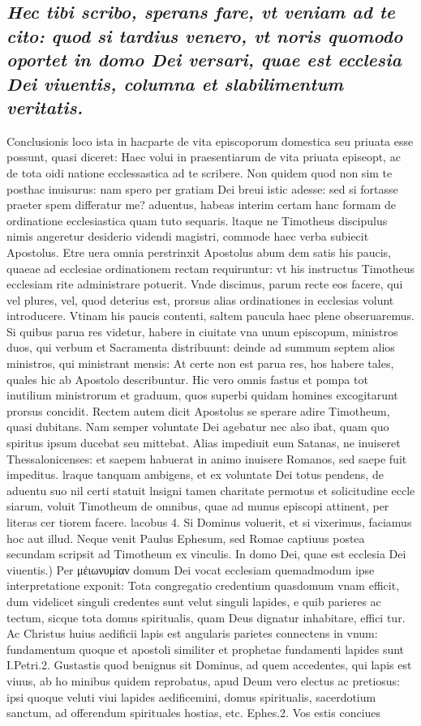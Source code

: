 \documentclass{article}
\begin{document}
\begin{pages}
\subsection*{\textit{Hec tibi scribo, sperans fare, vt veniam ad te cito: quod si tardius venero, vt noris quomodo oportet in domo Dei versari, quae est ecclesia Dei viuentis, columna et slabilimentum veritatis. }}\pstart Conclusionis loco ista in hacparte de vita episcoporum domestica seu priuata esse possunt, quasi diceret: Haec volui in praesentiarum de vita priuata episeopt, ac de tota oidi natione ecclessastica ad te scribere. Non quidem quod non sim te posthac inuisurus: nam spero per gratiam Dei breui istic adesse: sed si fortasse praeter spem differatur me? aduentus, habeas interim certam hanc formam de ordinatione ecclesiastica quam tuto sequaris. ltaque ne Timotheus discipulus nimis angeretur desiderio videndi magistri, commode haec verba subiecit Apostolus. Etre uera omnia perstrinxit Apostolus abum dem satis his paucis, quaeae ad ecclesiae ordinationem rectam requiruntur: vt his instructus Timotheus ecclesiam rite administrare potuerit. Vnde discimus, parum recte eos facere, qui vel plures, vel, quod deterius est, prorsus alias ordinationes in ecclesias volunt introducere. Vtinam his paucis contenti, saltem paucula haec plene obseruaremus. Si quibus parua res videtur, habere in ciuitate vna unum episcopum, ministros duos, qui verbum et Sacramenta distribuunt: deinde ad summum septem alios ministros, qui ministrant mensis: At certe non est parua res, hos habere tales, quales hic ab Apostolo describuntur. Hic vero omnis fastus et pompa tot inutilium ministrorum et graduum, quos superbi quidam homines excogitarunt prorsus concidit. Rectem autem dicit Apostolus se sperare adire Timotheum, quasi dubitans. Nam semper voluntate Dei agebatur nec also ibat, quam quo spiritus ipsum ducebat seu mittebat. Alias impediuit eum Satanas, ne inuiseret Thessalonicenses: et saepem habuerat in animo inuisere Romanos, sed saepe fuit impeditus. lraque tanquam ambigens, et ex voluntate Dei totus pendens, de aduentu suo nil certi statuit lnsigni tamen charitate permotus et solicitudine eccle siarum, voluit Timotheum de omnibus, quae ad munus episcopi attinent, per literas cer tiorem facere. lacobus 4. Si Dominus voluerit, et si vixerimus, faciamus hoc aut illud. Neque venit Paulus Ephesum, sed Romae captiuus postea secundam scripsit ad Timotheum ex vinculis.  \pend\pstart In domo Dei, quae est ecclesia Dei viuentis.) Per μἐιωνυμίαν domum Dei vocat ecclesiam quemadmodum ipse interpretatione exponit: Tota congregatio credentium quasdomum vnam efficit, dum videlicet singuli credentes sunt velut singuli lapides, e quib parieres ac tectum, sicque tota domus spiritualis, quam Deus dignatur inhabitare, effici tur. Ac Christus huius aedificii lapis est angularis parietes connectens in vnum: fundamentum quoque et apostoli similiter et prophetae fundamenti lapides sunt I.Petri.2. Gustastis quod benignus sit Dominus, ad quem accedentes, qui lapis est viuus, ab ho minibus quidem reprobatus, apud Deum vero electus ac pretiosus: ipsi quoque veluti viui lapides aedificemini, domus spiritualis, sacerdotium sanctum, ad offerendum spirituales hostias, etc. Ephes.2. Vos estis conciues 
\end{pages}
\end{document}
